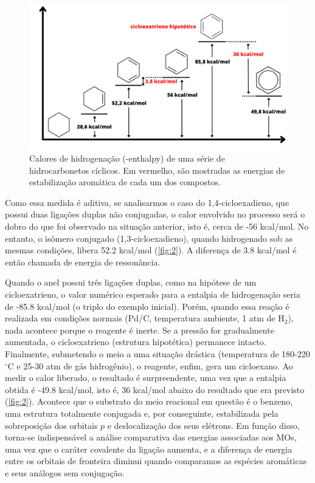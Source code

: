 \begin{figure}[htb!]
	\caption{\label{fig:2} Calores de hidrogenação (-\gls{enthalpy}) de uma série de hidrocarbonetos cíclicos. Em vermelho, são mostradas as energias de estabilização aromática de cada um dos compostos.}
	\begin{center}
		\includegraphics[width=1.0\textwidth]{images/fig2(10).png}
	\end{center}
\end{figure}

Como essa medida é aditiva, se analisarmos o caso do 1,4-cicloexadieno, que possui duas ligações duplas não conjugadas, o calor envolvido no processo será o dobro do que foi observado na situação anterior, isto é, cerca de -56 kcal/mol. No entanto, o isômero conjugado (1,3-cicloexadieno), quando hidrogenado sob as mesmas condições, libera 52.2 kcal/mol (\autoref{fig:2}). A diferença de 3.8 kcal/mol é então chamada de energia de ressonância.

Quando o anel possui três ligações duplas, como na hipótese de um cicloexatrieno, o valor numérico esperado para a entalpia de hidrogenação seria de -85.8 kcal/mol (o triplo do exemplo inicial). Porém, quando essa reação é realizada em condições normais (Pd/C, temperatura ambiente, 1 atm de H$_2$), nada acontece porque o reagente é inerte. Se a pressão for gradualmente aumentada, o cicloexatrieno (estrutura hipotética) permanece intacto. Finalmente, submetendo o meio a uma situação drástica (temperatura de 180-220$^\circ$C e 25-30 atm de gás hidrogênio), o reagente, enfim, gera um cicloexano. Ao medir o calor liberado, o resultado é surpreendente, uma vez que a entalpia obtida é -49.8 kcal/mol, isto é, 36 kcal/mol abaixo do resultado que era previsto (\autoref{fig:2}). Acontece que o substrato do meio reacional em questão é o benzeno, uma estrutura totalmente conjugada e, por conseguinte, estabilizada pela sobreposição dos orbitais $p$ \autocite{Shaabani2008, Xu2021} e deslocalização dos seus elétrons. Em função disso, torna-se indispensável a análise comparativa das energias associadas aos \gls{MOs}, uma vez que o caráter covalente da ligação aumenta, e a diferença de energia entre os orbitais de fronteira diminui quando comparamos as espécies aromáticas e seus análogos sem conjugação.

